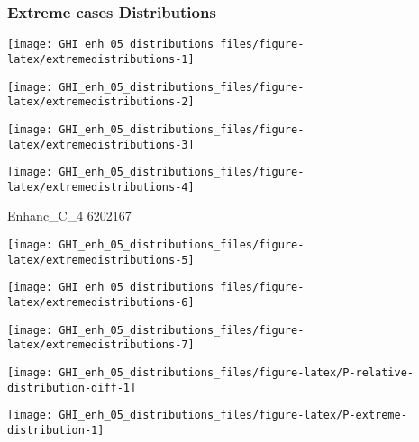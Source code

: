 \documentclass[
  10pt,
  a4paper,oneside]{article}
\begin{document}
\hypertarget{extreme-cases-distributions}{%
\subsubsection{Extreme cases Distributions}\label{extreme-cases-distributions}}

\begin{center}\texttt{[image: GHI\_enh\_05\_distributions\_files/figure-latex/extremedistributions-1]} \end{center}

\begin{center}\texttt{[image: GHI\_enh\_05\_distributions\_files/figure-latex/extremedistributions-2]} \end{center}

\begin{center}\texttt{[image: GHI\_enh\_05\_distributions\_files/figure-latex/extremedistributions-3]} \end{center}

\begin{center}\texttt{[image: GHI\_enh\_05\_distributions\_files/figure-latex/extremedistributions-4]} \end{center}

Enhanc\_C\_4
6202167

\begin{center}\texttt{[image: GHI\_enh\_05\_distributions\_files/figure-latex/extremedistributions-5]} \end{center}

\begin{center}\texttt{[image: GHI\_enh\_05\_distributions\_files/figure-latex/extremedistributions-6]} \end{center}

\begin{center}\texttt{[image: GHI\_enh\_05\_distributions\_files/figure-latex/extremedistributions-7]} \end{center}

\begin{center}\texttt{[image: GHI\_enh\_05\_distributions\_files/figure-latex/P-relative-distribution-diff-1]} \end{center}

\begin{center}\texttt{[image: GHI\_enh\_05\_distributions\_files/figure-latex/P-extreme-distribution-1]} \end{center}
\end{document}
